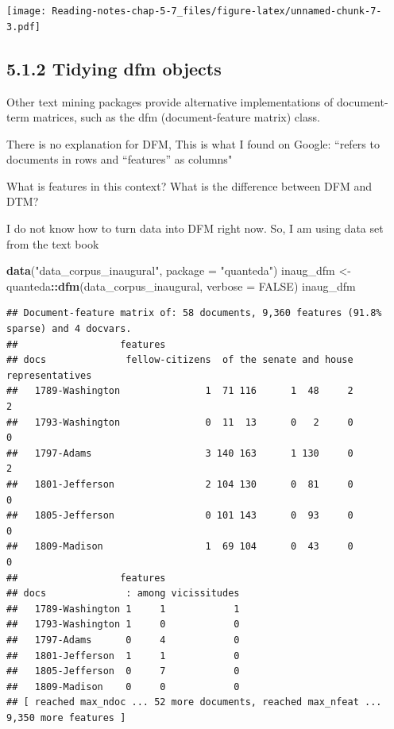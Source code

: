\documentclass[]{article}
\newenvironment{Shaded}{\begin{snugshade}}{\end{snugshade}}
\newcommand{\DataTypeTok}[1]{\textcolor[rgb]{0.13,0.29,0.53}{#1}}
\newcommand{\KeywordTok}[1]{\textcolor[rgb]{0.13,0.29,0.53}{\textbf{#1}}}
\newcommand{\NormalTok}[1]{#1}
\newcommand{\OperatorTok}[1]{\textcolor[rgb]{0.81,0.36,0.00}{\textbf{#1}}}
\newcommand{\OtherTok}[1]{\textcolor[rgb]{0.56,0.35,0.01}{#1}}
\newcommand{\StringTok}[1]{\textcolor[rgb]{0.31,0.60,0.02}{#1}}
\begin{document}
\texttt{[image: Reading-notes-chap-5-7\_files/figure-latex/unnamed-chunk-7-3.pdf]}

\hypertarget{tidying-dfm-objects}{%
\subsection{5.1.2 Tidying dfm objects}\label{tidying-dfm-objects}}

Other text mining packages provide alternative implementations of
document-term matrices, such as the dfm (document-feature matrix) class.

There is no explanation for DFM, This is what I found on Google:
``refers to documents in rows and ``features'' as columns"

What is features in this context? What is the difference between DFM and
DTM?

I do not know how to turn data into DFM right now. So, I am using data
set from the text book

\begin{Shaded}
\begin{Highlighting}[]
\KeywordTok{data}\NormalTok{(}\StringTok{"data_corpus_inaugural"}\NormalTok{, }\DataTypeTok{package =} \StringTok{"quanteda"}\NormalTok{)}
\NormalTok{inaug_dfm <-}\StringTok{ }\NormalTok{quanteda}\OperatorTok{::}\KeywordTok{dfm}\NormalTok{(data_corpus_inaugural, }\DataTypeTok{verbose =} \OtherTok{FALSE}\NormalTok{)}
\NormalTok{inaug_dfm}
\end{Highlighting}
\end{Shaded}

\begin{verbatim}
## Document-feature matrix of: 58 documents, 9,360 features (91.8% sparse) and 4 docvars.
##                  features
## docs              fellow-citizens  of the senate and house representatives
##   1789-Washington               1  71 116      1  48     2               2
##   1793-Washington               0  11  13      0   2     0               0
##   1797-Adams                    3 140 163      1 130     0               2
##   1801-Jefferson                2 104 130      0  81     0               0
##   1805-Jefferson                0 101 143      0  93     0               0
##   1809-Madison                  1  69 104      0  43     0               0
##                  features
## docs              : among vicissitudes
##   1789-Washington 1     1            1
##   1793-Washington 1     0            0
##   1797-Adams      0     4            0
##   1801-Jefferson  1     1            0
##   1805-Jefferson  0     7            0
##   1809-Madison    0     0            0
## [ reached max_ndoc ... 52 more documents, reached max_nfeat ... 9,350 more features ]
\end{verbatim}
\end{document}
